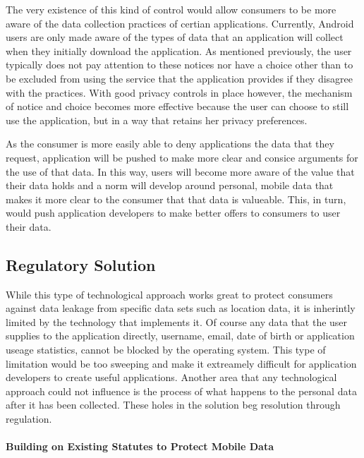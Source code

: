 The very existence of this kind of control would allow consumers to be more aware of the data collection practices of certian applications. Currently, Android users are only made aware of the types of data that an application will collect when they initially download the application. As mentioned previously, the user typically does not pay attention to these notices nor have a choice other than to be excluded from using the service that the application provides if they disagree with the practices.
With good privacy controls in place however, the mechanism of notice and choice becomes more effective because the user can choose to still use the application, but in a way that retains her privacy preferences.

As the consumer is more easily able to deny applications the data that they request, application will be pushed to make more clear and consice arguments for the use of that data. In this way, users will become more aware of the value that their data holds and a norm will develop around personal, mobile data that makes it more clear to the consumer that that data is valueable. 
This, in turn, would push application developers to make better offers to consumers to user their data. 


 	\subsection{Regulatory Solution}

While this type of technological approach works great to protect consumers against data leakage from specific data sets such as location data, it is inherintly limited by the technology that implements it. Of course any data that the user supplies to the application directly, username, email, date of birth or application useage statistics, cannot be blocked by the operating system. This type of limitation would be too sweeping and make it extreamely difficult for application developers to create useful applications. 
Another area that any technological approach could not influence is the process of what happens to the personal data after it has been collected. These holes in the solution beg resolution through regulation. 

	\paragraph{Building on Existing Statutes to Protect Mobile Data}

